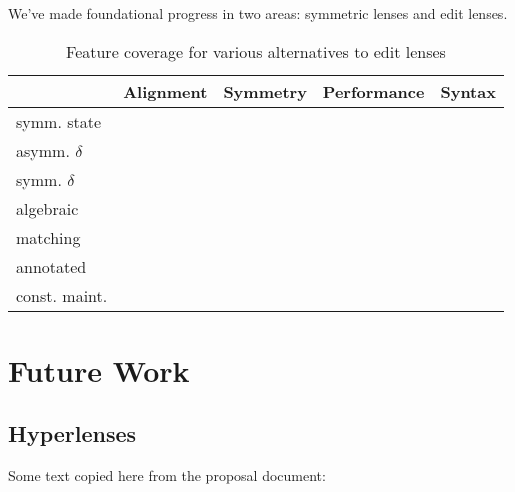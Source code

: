 We've made foundational progress in two areas: symmetric lenses and edit
lenses.
\begin{table}
    \begin{center}
        \begin{tabularx}{\linewidth}{m{4.4em}|XXXX}
        & \hfil Alignment \hfil & \hfil Symmetry \hfil & \hfil Performance \hfil & \hfil Syntax \hfil \\
        \hline
        symm. state     &
                        &
                        &\N
                        &
        \\
        asymm. $\delta$ &\Y
                        &\N
                        &\N
                        &\Y
        \\
        symm. $\delta$  &\Y
                        &\Y
                        &\N
                        &\N
        \\
        algebraic       &\Y
                        &\N
                        &
                        &
        \\
        matching        &
                        &\N
                        &\N
                        &\Y
        \\
        annotated       &
                        &\N
                        &\N
                        &\Y
        \\
        const. maint.   &\Y
                        &\Y
                        &\N
                        &
    \end{tabularx}
    \end{center}
    \caption{Feature coverage for various alternatives to edit lenses}
    \label{tab:related-commentary}
\end{table}

\section{Future Work}
\label{sec:future}

\subsection{Hyperlenses}
\label{sec:future-hyperlenses}
Some text copied here from the proposal document:

